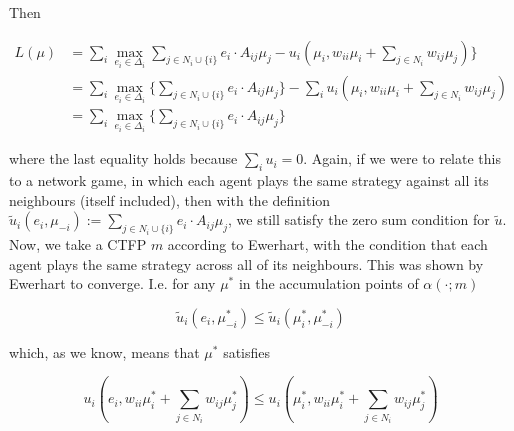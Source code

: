 \documentclass{article}
\theoremstyle{definition}
\begin{document}
	Then
	
	\begin{align}
	L(\mu) &= \sum_i \max_{e_i \in \Delta_i}\sum_{j \in N_i \cup \{i\}} e_i \cdot A_{ij} \mu_j  - u_i(\mu_i, w_{ii} \mu_i + \sum_{j \in N_i} w_{ij} \mu_j) \} \nonumber \\
	&= \sum_i \max_{e_i \in \Delta_i} \{\sum_{j \in N_i \cup \{i\}} e_i \cdot A_{ij} \mu_j  \} - \sum_i  u_i(\mu_i, w_{ii} \mu_i + \sum_{j \in N_i} w_{ij} \mu_j) \nonumber \\
	&= \sum_i \max_{e_i \in \Delta_i} \{\sum_{j \in N_i \cup \{i\}} e_i \cdot A_{ij} \mu_j  \} \nonumber 
	\end{align}
	
	where the last equality holds because $\sum_i u_i = 0$. Again, if we were to relate this to a network game, in which each agent plays the same strategy against all its neighbours (itself included), then with the definition $ \tilde{u}_i (e_i, \mu_{-i}) := \sum_{j \in N_i \cup \{i\}} e_i \cdot A_{ij} \mu_j$, we still satisfy the zero sum condition for $\tilde{u}$. Now, we take a CTFP $m$ according to Ewerhart, with the condition that each agent plays the same strategy across all of its neighbours. This was shown by Ewerhart to converge. I.e. for any $\mu^*$ in the accumulation points of $\alpha(\cdot; m)$
	
	\begin{equation*}
		\tilde{u}_i(e_i, \mu_{-i}^*) \leq \tilde{u}_i(\mu_i^*, \mu_{-i}^*)
	\end{equation*}
	
	which, as we know, means that $\mu^*$ satisfies
	
	\begin{equation*}
		u_i(e_i, w_{ii} \mu_i^* + \sum_{j \in N_i} w_{ij} \mu_j^*) \leq  u_i(\mu_i^*, w_{ii} \mu_i^* + \sum_{j \in N_i} w_{ij} \mu_j^*)
	\end{equation*}
	
	
\end{document}
